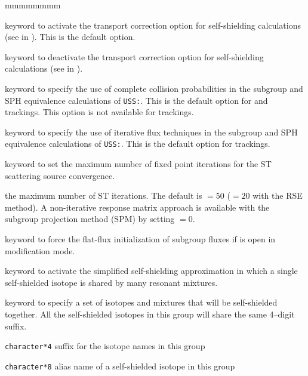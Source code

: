 \begin{ListeDeDescription}{mmmmmmmm}
\item[\moc{TRAN}] keyword to activate the transport correction option for
self-shielding calculations (see  in ). This
is the default option.

\item[\moc{NOTR}] keyword to deactivate the transport correction option for
self-shielding calculations (see  in ).

\item[\moc{PIJ}] keyword to specify the use of complete collision
probabilities in the subgroup and SPH equivalence calculations of {\tt USS:}.
This is the default option for  and  trackings.
This option is not available for  trackings.

\item[\moc{ARM}] keyword to specify the use of iterative flux techniques
in the subgroup and SPH equivalence calculations of {\tt USS:}.
This is the default option for  trackings.

\item[\moc{MAXST}] keyword to set the maximum number of fixed point iterations
for the ST scattering source convergence.

\item[\dusa{imax}] the maximum number of ST iterations. The default is
 $=50$ ($=20$ with the RSE method). A non-iterative response matrix approach is available with
the subgroup projection method (SPM) by setting  $=0$.

\item[\moc{FLAT}] keyword to force the flat-flux initialization of subgroup fluxes if 
is open in modification mode.

\item[\moc{CALC}] keyword to activate the simplified self-shielding
approximation in which a single self-shielded isotope is shared by many
resonant mixtures.

\item[\moc{REGI}] keyword to specify a set of isotopes and mixtures that
will be self-shielded together. All the self-shielded isotopes in this group
will share the same 4--digit suffix.

\item[\dusa{suffix}] {\tt character*4} suffix for the isotope names in this
group

\item[\dusa{isot}] {\tt character*8} alias name of a self-shielded isotope in this
group


\end{ListeDeDescription}
